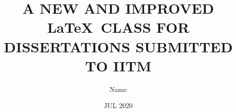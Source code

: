 
\title{A NEW AND IMPROVED \LaTeX\ CLASS FOR DISSERTATIONS SUBMITTED TO IITM}

\author{Name}

\date{JUL 2020}


\maketitle
